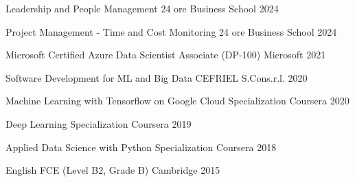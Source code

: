 

\begin{cvhonors}

  \cvhonor
    {Leadership and People Management } %
    {24 ore Business School} %
    {} %
    {2024} %

  \cvhonor
    {Project Management - Time and Cost Monitoring} %
    {24 ore Business School} %
    {} %
    {2024} %

  \cvhonor
    {Microsoft Certified Azure Data Scientist Associate (DP-100)} %
    {Microsoft} %
    {} %
    {2021} %

  \cvhonor
    {Software Development for ML and Big Data} %
    {CEFRIEL S.Cons.r.l.} %
    {} %
    {2020} %

  \cvhonor
    {Machine Learning with Tensorflow on Google Cloud Specialization} %
    {Coursera} %
    {} %
    {2020} %

  \cvhonor
    {Deep Learning Specialization} %
    {Coursera} %
    {} %
    {2019} %

  \cvhonor
    {Applied Data Science with Python Specialization} %
    {Coursera} %
    {} %
    {2018} %
    
  \cvhonor
    {English FCE (Level B2, Grade B)} %
    {Cambridge} %
    {} %
    {2015} %

\end{cvhonors}